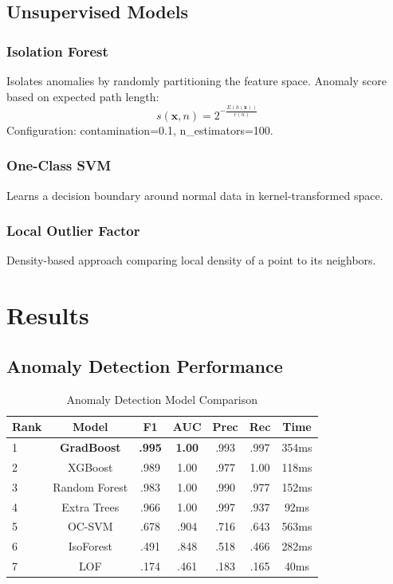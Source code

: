 \documentclass[conference]{IEEEtran}
\begin{document}
\subsection{Unsupervised Models}

\subsubsection{Isolation Forest}
Isolates anomalies by randomly partitioning the feature space. Anomaly score based on expected path length:
\begin{equation}
s(\mathbf{x}, n) = 2^{-\frac{E(h(\mathbf{x}))}{c(n)}}
\end{equation}
Configuration: contamination=0.1, n\_estimators=100.

\subsubsection{One-Class SVM}
Learns a decision boundary around normal data in kernel-transformed space.

\subsubsection{Local Outlier Factor}
Density-based approach comparing local density of a point to its neighbors.

\section{Results}

\subsection{Anomaly Detection Performance}

\begin{table}[H]
\centering
\caption{Anomaly Detection Model Comparison}
\label{tab:anomaly_results}
\begin{tabular}{lcccccc}
\toprule
\textbf{Rank} & \textbf{Model} & \textbf{F1} & \textbf{AUC} & \textbf{Prec} & \textbf{Rec} & \textbf{Time} \\
\midrule
1 & \textbf{GradBoost} & \textbf{.995} & \textbf{1.00} & .993 & .997 & 354ms \\
2 & XGBoost & .989 & 1.00 & .977 & 1.00 & 118ms \\
3 & Random Forest & .983 & 1.00 & .990 & .977 & 152ms \\
4 & Extra Trees & .966 & 1.00 & .997 & .937 & 92ms \\
5 & OC-SVM & .678 & .904 & .716 & .643 & 563ms \\
6 & IsoForest & .491 & .848 & .518 & .466 & 282ms \\
7 & LOF & .174 & .461 & .183 & .165 & 40ms \\
\bottomrule
\end{tabular}
\end{table}
\end{document}
